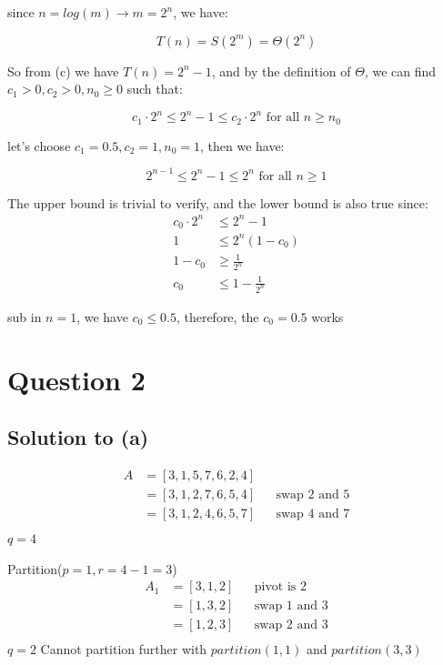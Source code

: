 \documentclass{article}
\begin{document}
since \(n = log(m) \rightarrow m=2^{n}\), we have:

\[T(n) = S(2^m) = \Theta(2^n)\]

So from (c) we have \(T(n) = 2^n - 1\), and by the definition of \(\Theta\), we can find \(c_1>0, c_2>0, n_0\ge 0 \) such that:

\[c_1 \cdot 2^n \leq 2^n - 1 \leq c_2 \cdot 2^n \text{ for all } n \geq n_0\]

let's choose \(c_1 = 0.5, c_2 = 1, n_0 = 1\), then we have:

\[2^{n-1} \leq 2^n - 1 \leq 2^n \text{ for all } n \geq 1\]

The upper bound is trivial to verify, and the lower bound  is also true since:
\begin{align*}
    c_0\cdot 2^{n} &\leq 2^n - 1 \\
    1 &\leq 2^{n} (1 - c_0) \\
    1 - c_0 &\ge \frac{1}{2^n} \\
    c_0 &\leq 1 - \frac{1}{2^n}
\end{align*}

sub in \(n=1\), we have \(c_0 \leq 0.5\), therefore, the \(c_0 = 0.5\) works

\newpage

\section*{Question 2}
\subsection*{Solution to (a)}

\begin{align*}
A &=[3, 1, 5, 7, 6, 2, 4] \\
&= [3, 1, 2, 7, 6, 5, 4] && \text{swap 2 and 5} \\
&= [3, 1, 2, 4, 6, 5, 7] && \text{swap 4 and 7} \\
\end{align*}
\(q = 4 \)

Partition(\(p = 1, r = 4-1 = 3\))
\begin{align*}
    A_1 &= [3, 1, 2] && \text{pivot is 2} \\
    &= [1, 3, 2] && \text{swap 1 and 3} \\
    &= [1, 2, 3] && \text{swap 2 and 3} \\
\end{align*}
\(q=2\) Cannot partition further with \(partition(1, 1)\) and \(partition(3,3)\)
\end{document}
